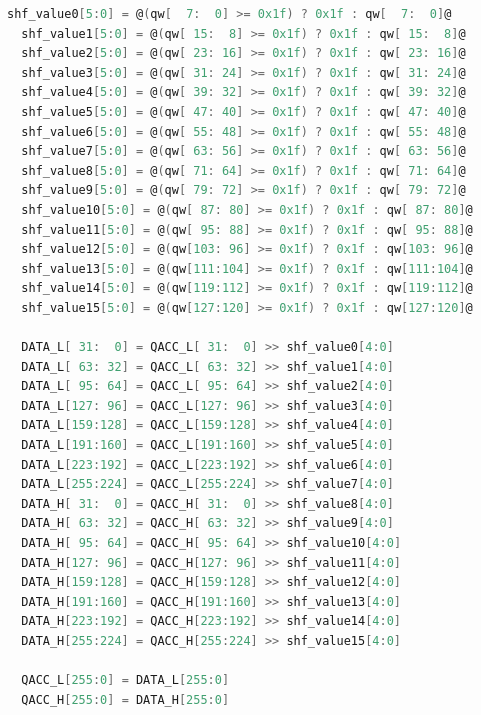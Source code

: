 \begin{lstlisting}[language=C, escapechar=@]
  shf_value0[5:0] = @(qw[  7:  0] >= 0x1f) ? 0x1f : qw[  7:  0]@
  shf_value1[5:0] = @(qw[ 15:  8] >= 0x1f) ? 0x1f : qw[ 15:  8]@
  shf_value2[5:0] = @(qw[ 23: 16] >= 0x1f) ? 0x1f : qw[ 23: 16]@
  shf_value3[5:0] = @(qw[ 31: 24] >= 0x1f) ? 0x1f : qw[ 31: 24]@
  shf_value4[5:0] = @(qw[ 39: 32] >= 0x1f) ? 0x1f : qw[ 39: 32]@
  shf_value5[5:0] = @(qw[ 47: 40] >= 0x1f) ? 0x1f : qw[ 47: 40]@
  shf_value6[5:0] = @(qw[ 55: 48] >= 0x1f) ? 0x1f : qw[ 55: 48]@
  shf_value7[5:0] = @(qw[ 63: 56] >= 0x1f) ? 0x1f : qw[ 63: 56]@
  shf_value8[5:0] = @(qw[ 71: 64] >= 0x1f) ? 0x1f : qw[ 71: 64]@
  shf_value9[5:0] = @(qw[ 79: 72] >= 0x1f) ? 0x1f : qw[ 79: 72]@
  shf_value10[5:0] = @(qw[ 87: 80] >= 0x1f) ? 0x1f : qw[ 87: 80]@
  shf_value11[5:0] = @(qw[ 95: 88] >= 0x1f) ? 0x1f : qw[ 95: 88]@
  shf_value12[5:0] = @(qw[103: 96] >= 0x1f) ? 0x1f : qw[103: 96]@
  shf_value13[5:0] = @(qw[111:104] >= 0x1f) ? 0x1f : qw[111:104]@
  shf_value14[5:0] = @(qw[119:112] >= 0x1f) ? 0x1f : qw[119:112]@
  shf_value15[5:0] = @(qw[127:120] >= 0x1f) ? 0x1f : qw[127:120]@

  DATA_L[ 31:  0] = QACC_L[ 31:  0] >> shf_value0[4:0]
  DATA_L[ 63: 32] = QACC_L[ 63: 32] >> shf_value1[4:0]
  DATA_L[ 95: 64] = QACC_L[ 95: 64] >> shf_value2[4:0]
  DATA_L[127: 96] = QACC_L[127: 96] >> shf_value3[4:0]
  DATA_L[159:128] = QACC_L[159:128] >> shf_value4[4:0]
  DATA_L[191:160] = QACC_L[191:160] >> shf_value5[4:0]
  DATA_L[223:192] = QACC_L[223:192] >> shf_value6[4:0]
  DATA_L[255:224] = QACC_L[255:224] >> shf_value7[4:0]
  DATA_H[ 31:  0] = QACC_H[ 31:  0] >> shf_value8[4:0]
  DATA_H[ 63: 32] = QACC_H[ 63: 32] >> shf_value9[4:0]
  DATA_H[ 95: 64] = QACC_H[ 95: 64] >> shf_value10[4:0]
  DATA_H[127: 96] = QACC_H[127: 96] >> shf_value11[4:0]
  DATA_H[159:128] = QACC_H[159:128] >> shf_value12[4:0]
  DATA_H[191:160] = QACC_H[191:160] >> shf_value13[4:0]
  DATA_H[223:192] = QACC_H[223:192] >> shf_value14[4:0]
  DATA_H[255:224] = QACC_H[255:224] >> shf_value15[4:0]

  QACC_L[255:0] = DATA_L[255:0]
  QACC_H[255:0] = DATA_H[255:0]


\end{lstlisting}
